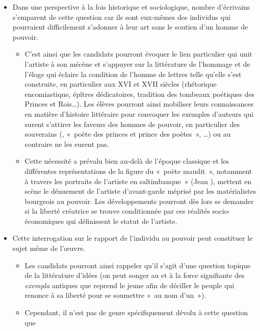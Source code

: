 {\begin{itemize}[label=\textbullet]
\item Dans une perspective à la fois historique et sociologique, nombre
d'écrivains s'emparent de cette question car ils sont eux-mêmes des
individus qui pourraient difficilement s'adonner à leur art sans le soutien
d'un homme de pouvoir.
\begin{itemize}[label=]
\item C'est ainsi que les candidats pourront évoquer le lien particulier qui unit l'artiste
à son mécène et s'appuyer sur la littérature de l'hommage et de l'éloge qui
éclaire la condition de l'homme de lettres telle qu'elle s'est construite, en
particulier aux XVI\ieme{} et XVII\ieme{} siècles (rhétorique encomiastique, épîtres
dédicatoires, tradition des tombeaux poétiques des Princes et Rois…). Les
élèves pourront ainsi mobiliser leurs connaissances en matière d'histoire
littéraire pour convoquer les exemples d'auteurs qui surent s'attirer les faveurs
des hommes de pouvoir, en particulier des souverains (, «~poète des
princes et prince des poètes~», …) ou au contraire ne les eurent pas.
\item Cette nécessité a prévalu bien au-delà de l'époque classique et les différentes
représentations de la figure du «~poète maudit~», notamment à travers les
portraits de l'artiste en saltimbanque~» (Jean ), mettent en scène le
dénuement de l'artiste d'avant-garde méprisé par les matérialistes bourgeois
au pouvoir. Les développements pourront dès lors se demander si la liberté
créatrice se trouve conditionnée par ces réalités socio-économiques qui
définissent le statut de l'artiste.
\end{itemize}
\item Cette interrogation sur le rapport de l'individu au pouvoir peut constituer
le sujet même de l'œuvre.
\begin{itemize}[label=]
\item Les candidats pourront ainsi rappeler qu'il s'agit d'une question topique de la 
littérature d'idées (on peut songer au  et à la
force signifiante des \textit{exempla} antiques que reprend le jeune  afin de
déciller le peuple qui renonce à sa liberté pour se soumettre «~au nom d'un~»).
\item Cependant, il n'est pas de genre spécifiquement dévolu à cette question que

\end{itemize}
\end{itemize}}
